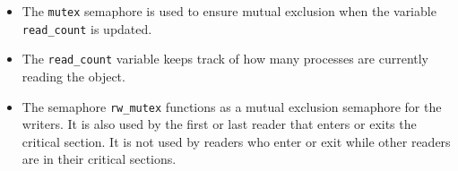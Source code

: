 \documentclass{article}
\theoremstyle{plain}
\theoremstyle{definition}
\begin{document}
\begin{itemize}
    \item The \texttt{mutex} semaphore is used to ensure mutual exclusion when the
variable \texttt{read\_count} is updated. 

    \item The \texttt{read\_count} variable keeps track of how many processes are currently reading the object. 
    
    \item The semaphore \texttt{rw\_mutex} functions as a mutual exclusion semaphore for the writers. It is also used by the first or last reader that enters or exits the critical section. It is not used by readers who enter or exit while other readers are in their critical sections.
\end{itemize}
\end{document}
